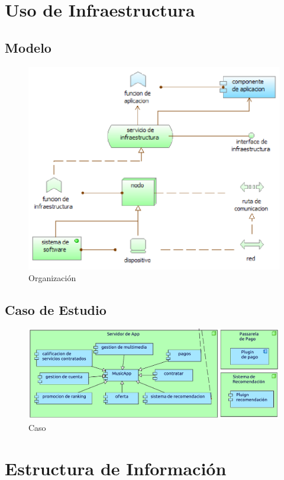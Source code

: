\newpage

\section{Uso de Infraestructura}
\subsection{Modelo}
\begin{figure}[h!]
	\centering
	\includegraphics[width=0.8\linewidth]{Arquitectura/Tecnologia/imgs/uso.PNG}
	\caption{Organización}
\end{figure}
\newpage
\subsection{Caso de Estudio}

\begin{figure}[h!]
	\centering
	\includegraphics[width=\linewidth]{Arquitectura/Tecnologia/imgs/uso.pdf}
	\caption{Caso}
\end{figure}

\newpage

\section{Estructura de Información}
